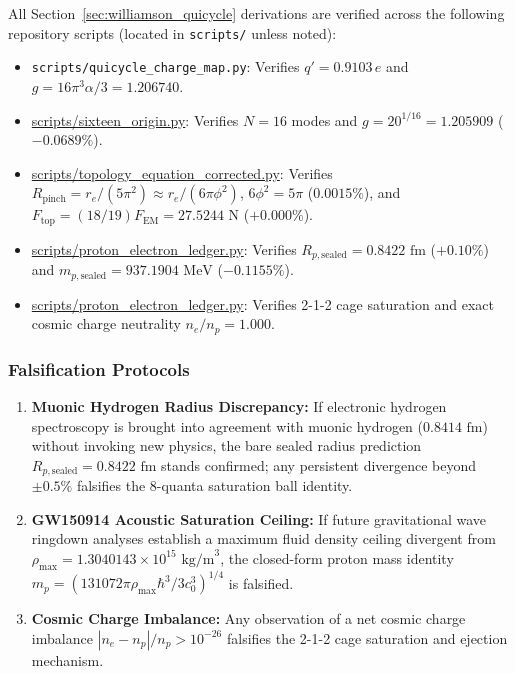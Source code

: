 \documentclass[11pt,a4paper]{article}
\begin{document}
All Section~\ref{sec:williamson_quicycle} derivations are verified across the following repository scripts (located in \texttt{scripts/} unless noted):
\begin{itemize}
    \item \texttt{scripts/quicycle\_charge\_map.py}: Verifies $q' = 0.9103\,e$ and $g = 16\pi^3\alpha/3 = 1.206740$.
    \item \url{scripts/sixteen_origin.py}: Verifies $N = 16$ modes and $g = 20^{1/16} = 1.205909$ ($-0.0689\%$).
    \item \url{scripts/topology_equation_corrected.py}: Verifies $R_{\text{pinch}} = r_e / (5\pi^2) \approx r_e / (6\pi\phi^2)$, $6\phi^2 = 5\pi$ ($0.0015\%$), and $F_{\text{top}} = (18/19)F_{\text{EM}} = 27.5244\text{ N}$ ($+0.000\%$).
    \item \url{scripts/proton_electron_ledger.py}: Verifies $R_{p,\text{sealed}} = 0.8422\text{ fm}$ ($+0.10\%$) and $m_{p,\text{sealed}} = 937.1904\text{ MeV}$ ($-0.1155\%$).
    \item \url{scripts/proton_electron_ledger.py}: Verifies 2-1-2 cage saturation and exact cosmic charge neutrality $n_e / n_p = 1.000$.
\end{itemize}

\subsubsection{Falsification Protocols}
\label{subsubsec:williamson_falsification}

\begin{enumerate}
    \item \textbf{Muonic Hydrogen Radius Discrepancy:} If electronic hydrogen spectroscopy is brought into agreement with muonic hydrogen ($0.8414\text{ fm}$) without invoking new physics, the bare sealed radius prediction $R_{p,\text{sealed}} = 0.8422\text{ fm}$ stands confirmed; any persistent divergence beyond $\pm 0.5\%$ falsifies the 8-quanta saturation ball identity.
    \item \textbf{GW150914 Acoustic Saturation Ceiling:} If future gravitational wave ringdown analyses establish a maximum fluid density ceiling divergent from $\rho_{\max} = 1.3040143 \times 10^{15}\text{ kg/m}^3$, the closed-form proton mass identity $m_p = (131072\pi\rho_{\max}\hbar^3/3c_0^3)^{1/4}$ is falsified.
    \item \textbf{Cosmic Charge Imbalance:} Any observation of a net cosmic charge imbalance $|n_e - n_p| / n_p > 10^{-26}$ falsifies the 2-1-2 cage saturation and ejection mechanism.
\end{enumerate}
\end{document}

